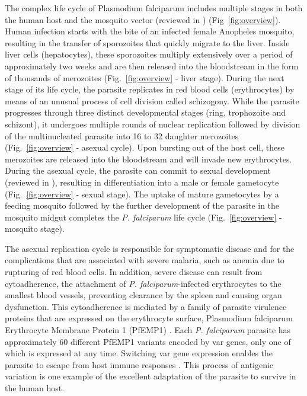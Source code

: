 The complex life cycle of Plasmodium falciparum includes multiple stages in
both the human host and the mosquito vector (reviewed in
\citet{greenwood:malaria}) (Fig~\ref{fig:overview}). Human
infection starts with the bite of an infected female Anopheles mosquito,
resulting in the transfer of sporozoites that quickly migrate to the liver.
Inside liver cells (hepatocytes), these sporozoites multiply extensively over
a period of approximately two weeks and are then released into the bloodstream
in the form of thousands of merozoites (Fig.~\ref{fig:overview} - liver stage).
During the next
stage of its life cycle, the parasite replicates in red blood cells
(erythrocytes) by means of an unusual process of cell division called
schizogony. While the parasite progresses through three distinct developmental
stages (ring, trophozoite and schizont), it undergoes multiple rounds of
nuclear replication followed by division of the multinucleated parasite into
16 to 32 daughter merozoites (Fig.~\ref{fig:overview} - asexual cycle).
Upon bursting out of
the host cell, these merozoites are released into the bloodstream and will
invade new erythrocytes. During the asexual cycle, the parasite can commit to
sexual development (reviewed in \citet{baker:malaria}),
resulting in differentiation into a male
or female gametocyte (Fig.~\ref{fig:overview} - sexual stage). The uptake of mature gametocytes
by a feeding mosquito followed by the further development of the parasite in
the mosquito midgut completes the \textit{P. falciparum} life cycle
(Fig.~\ref{fig:overview} - mosquito
stage).

The asexual replication cycle is responsible for symptomatic disease and for
the complications that are associated with severe malaria, such as anemia due
to rupturing of red blood cells. In addition, severe disease can result from
cytoadherence, the attachment of \textit{P. falciparum}-infected erythrocytes to the
smallest blood vessels, preventing clearance by the spleen and causing organ
dysfunction. This cytoadherence is mediated by a family of parasite virulence
proteins that are expressed on the erythrocyte surface, Plasmodium falciparum
Erythrocyte Membrane Protein 1 (PfEMP1) \citep{baruch:cloning, smith:switches,
su:large}. Each \textit{P. falciparum} parasite has
approximately 60 different PfEMP1 variants encoded by var genes, only one of
which is expressed at any time. Switching var gene expression enables the
parasite to escape from host immune responses \citep{bull:parasite,
roberts:rapid}. This process of antigenic
variation is one example of the excellent adaptation of the parasite to
survive in the human host.

